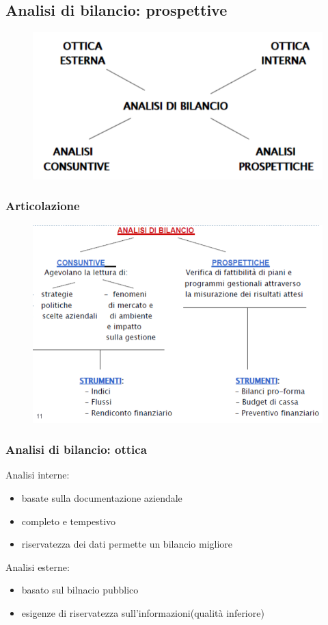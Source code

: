 \subsection{Analisi di bilancio: prospettive}
\begin{figure}[H]
    \centering
    \includegraphics[width=0.5\linewidth]{2/img/Screenshot from 2022-07-10 10-42-56.png}
\end{figure}

\subsubsection{Articolazione}
\begin{figure}[H]
    \centering
    \includegraphics[width=0.5\linewidth]{2/img/Screenshot from 2022-07-10 10-47-54.png}
\end{figure}

\subsubsection{Analisi di bilancio: ottica}
Analisi interne: 
\begin{itemize}
    \item basate sulla documentazione aziendale
    \item completo e tempestivo
    \item riservatezza dei dati permette un bilancio migliore
\end{itemize}


Analisi esterne: 
\begin{itemize}
    \item basato sul bilnacio pubblico
    \item esigenze di riservatezza sull'informazioni(qualità inferiore)
\end{itemize}

